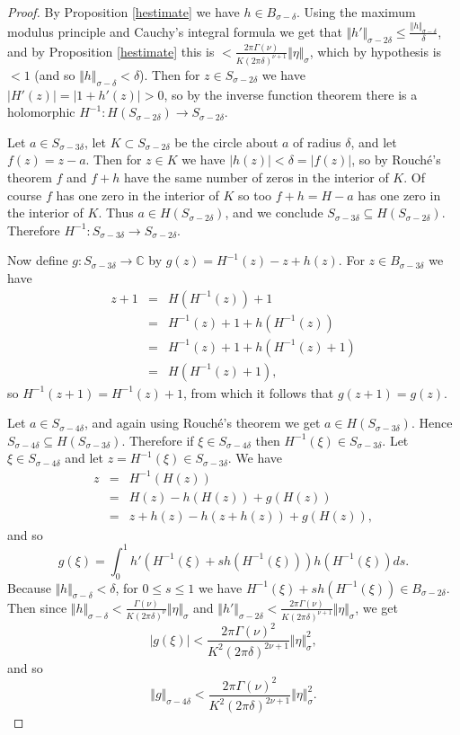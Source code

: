 \documentclass{article}
\newcommand{\norm}[1]{\Vert #1 \Vert}
\begin{document}
 \begin{proof}
 By Proposition \ref{hestimate} we have $h \in B_{\sigma-\delta}$. 
 Using the maximum modulus principle and Cauchy's integral formula we get that
$\norm{h'}_{\sigma-2\delta} \leq \frac{\norm{h}_{\sigma-\delta}}{\delta}$, and by Proposition \ref{hestimate} this is $< \frac{2\pi \Gamma(\nu)}{K(2\pi \delta)^{\nu+1}}\norm{\eta}_{\sigma}$, which by hypothesis is $<1$ (and so $\norm{h}_{\sigma-\delta} <\delta$).
Then for $z \in
 S_{\sigma-2\delta}$ we have $|H'(z)|=|1+h'(z)|>0$, so by the inverse function theorem there is a holomorphic
 $H^{-1}:H( S_{\sigma-2\delta}) \to  S_{\sigma-2\delta}$.

Let $a \in S_{\sigma-3\delta}$, let $K \subset S_{\sigma-2\delta}$ be the circle about $a$ of radius $\delta$, and let $f(z)=z-a$. Then for $z \in K$ we have $|h(z)| <\delta=|f(z)|$, so by Rouch\'e's theorem $f$ and $f+h$ have the same number of zeros in the interior of $K$. Of course $f$ has one zero in the interior of $K$ so too $f+h=H-a$ has one zero in the interior of $K$. Thus $a \in H(S_{\sigma-2\delta})$, and we conclude $S_{\sigma-3\delta} \subseteq H(S_{\sigma-2\delta})$. Therefore $H^{-1}:
S_{\sigma-3\delta} \to S_{\sigma-2\delta}$.

Now define $g:S_{\sigma-3\delta} \to \mathbb{C}$ by $g(z)=H^{-1}(z)-z+h(z)$. For 
$z \in B_{\sigma-3\delta}$ we have
\begin{eqnarray*}
z+1&=&H(H^{-1}(z))+1\\
&=&H^{-1}(z)+1+h(H^{-1}(z))\\
&=&H^{-1}(z)+1+h(H^{-1}(z)+1)\\
&=&H(H^{-1}(z)+1),
\end{eqnarray*}
so $H^{-1}(z+1)=H^{-1}(z)+1$, from which it follows that $g(z+1)=g(z)$.

Let $a \in S_{\sigma-4\delta}$, and again using Rouch\'e's theorem we get $a \in H(S_{\sigma-3\delta})$. Hence $S_{\sigma-4\delta} \subseteq H(S_{\sigma-3\delta})$. Therefore if
$\xi \in S_{\sigma-4\delta}$ then $H^{-1}(\xi) \in S_{\sigma-3\delta}$.
Let $\xi \in S_{\sigma-4\delta}$ and let $z=H^{-1}(\xi) \in S_{\sigma-3\delta}$.
We have
\begin{eqnarray*}
z&=&H^{-1}(H(z))\\
&=&H(z)-h(H(z))+g(H(z))\\
&=&z+h(z)-h(z+h(z))+g(H(z)),
\end{eqnarray*}
and so
\[
g(\xi)=\int_0^1 h'(H^{-1}(\xi)+sh(H^{-1}(\xi))) h(H^{-1}(\xi)) ds.
\]
Because $\norm{h}_{\sigma-\delta} < \delta$, for $0 \leq s \leq 1$ we have $H^{-1}(\xi)+sh(H^{-1}(\xi)) \in B_{\sigma-2\delta}$. Then since
$\norm{h}_{\sigma-\delta} < \frac{\Gamma(\nu)}{K(2\pi \delta)^\nu}\norm{\eta}_\sigma$
and
$\norm{h'}_{\sigma-2\delta} < \frac{2\pi \Gamma(\nu)}{K(2\pi \delta)^{\nu+1}}\norm{\eta}_{\sigma}$, we get
\[
|g(\xi)| <  \frac{2\pi \Gamma(\nu)^2}{K^2(2\pi \delta)^{2\nu+1}}\norm{\eta}_\sigma^2,
\]
and so
\[
\norm{g}_{\sigma-4\delta} < \frac{2\pi \Gamma(\nu)^2}{K^2(2\pi \delta)^{2\nu+1}}\norm{\eta}_\sigma^2.
\]
 \end{proof}
\end{document}
